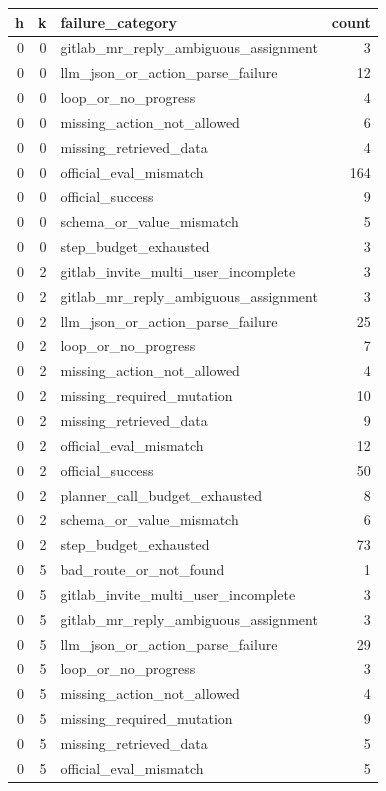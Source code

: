 \begin{tabular}{rrlr}
\toprule
h & k & failure_category & count \\
\midrule
0 & 0 & gitlab_mr_reply_ambiguous_assignment & 3 \\
0 & 0 & llm_json_or_action_parse_failure & 12 \\
0 & 0 & loop_or_no_progress & 4 \\
0 & 0 & missing_action_not_allowed & 6 \\
0 & 0 & missing_retrieved_data & 4 \\
0 & 0 & official_eval_mismatch & 164 \\
0 & 0 & official_success & 9 \\
0 & 0 & schema_or_value_mismatch & 5 \\
0 & 0 & step_budget_exhausted & 3 \\
0 & 2 & gitlab_invite_multi_user_incomplete & 3 \\
0 & 2 & gitlab_mr_reply_ambiguous_assignment & 3 \\
0 & 2 & llm_json_or_action_parse_failure & 25 \\
0 & 2 & loop_or_no_progress & 7 \\
0 & 2 & missing_action_not_allowed & 4 \\
0 & 2 & missing_required_mutation & 10 \\
0 & 2 & missing_retrieved_data & 9 \\
0 & 2 & official_eval_mismatch & 12 \\
0 & 2 & official_success & 50 \\
0 & 2 & planner_call_budget_exhausted & 8 \\
0 & 2 & schema_or_value_mismatch & 6 \\
0 & 2 & step_budget_exhausted & 73 \\
0 & 5 & bad_route_or_not_found & 1 \\
0 & 5 & gitlab_invite_multi_user_incomplete & 3 \\
0 & 5 & gitlab_mr_reply_ambiguous_assignment & 3 \\
0 & 5 & llm_json_or_action_parse_failure & 29 \\
0 & 5 & loop_or_no_progress & 3 \\
0 & 5 & missing_action_not_allowed & 4 \\
0 & 5 & missing_required_mutation & 9 \\
0 & 5 & missing_retrieved_data & 5 \\
0 & 5 & official_eval_mismatch & 5 \\

\end{tabular}
